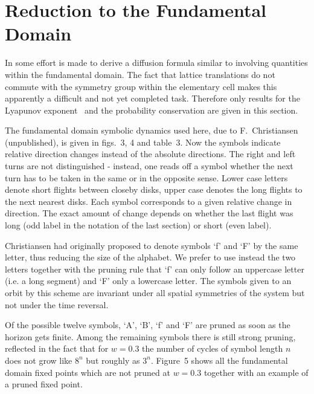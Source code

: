 \documentclass[pre,preprint,groupedaddress,showpacs,showkeys]{revtex4}
\begin{document}
\section{Reduction to the Fundamental Domain}
In  some effort is made to derive a diffusion formula similar to
 involving quantities within the fundamental domain. The
fact that lattice translations do not commute with the symmetry group within
the elementary cell makes this apparently a difficult and
not yet completed task.
Therefore only results for the Lyapunov exponent~ and the
probability conservation are given in this section.

The fundamental domain
symbolic dynamics used here, due to
F.~Christiansen (unpublished), is
given in figs.~3, 4 and table~3.
Now the symbols indicate relative direction changes
instead of the absolute directions.
The right and left turns are not distinguished - instead,  one reads
off a symbol whether the next
turn has to be taken in the same or in the opposite sense.
%
Lower case letters denote short flights between closeby disks, upper case
denotes the long flights to the next nearest disks.
Each symbol corresponds to a given relative change
in direction. The exact amount of
change depends on whether the last flight was
long (odd label in the notation of the last section) or short (even label).

Christiansen had
originally proposed to denote symbols `f' and `F' by the same
letter, thus reducing the size of the alphabet.
We prefer to use instead the
two letters together with the
pruning rule that `f' can only follow an uppercase
letter (i.e. a long segment) and `F' only a lowercase letter.
The symbols given to an orbit by this scheme are invariant under all spatial
symmetries of the system but not under the time reversal.

Of the possible twelve symbols,  `A', `B', `f' and `F'
are pruned as soon as the horizon gets finite.
Among the remaining symbols there is
still strong pruning,  reflected in the fact that
for $w = 0.3$ the
number of cycles of symbol length $n$
does not grow like $8^n$ but roughly as
$3^n$. Figure~5 shows all the fundamental domain fixed
points which are not pruned at $w=0.3$ together with an example
of a pruned fixed point.
\end{document}
